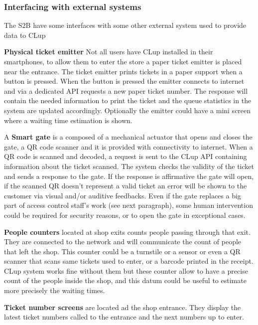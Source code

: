 \subsubsection{Interfacing with external systems}
The S2B have some interfaces with some other external system used to provide data to CLup 



\textbf{Physical ticket emitter} Not all users have CLup installed in their smartphones, to allow them to enter the store a paper ticket emitter is
placed near the entrance. The ticket emitter prints tickets in 
a paper support when a button is pressed. When the button is pressed the emitter connects to internet and via a dedicated API requests a new paper ticket number. The response will contain the needed information to print the ticket and the queue statistics in the system are updated accordingly. Optionally the emitter could have a mini screen where a waiting time estimation is shown.



A \textbf{Smart gate} is a composed of a mechanical actuator that opens and closes the gate, a QR code scanner and it is provided with connectivity to internet. When a QR code is scanned and decoded, a request is sent to the CLup API containing information about the ticket scanned.
The system checks the validity of the ticket and sends a response to the gate. If the response is affirmative the gate will open, if the scanned QR doesn't represent a valid ticket an error will be shown to the customer via visual and/or auditive feedbacks. Even if the gate replaces a big part of access control staff's work (see next paragraph), some human intervention could be required for security reasons, or to open the gate in exceptional cases. 


\textbf{People counters} located at shop exits counts people passing through that exit. They are connected to the network and will communicate the count of people that left the shop. This counter could be a turnstile or a sensor or even a QR scanner that scans same tickets used to enter, or a barcode printed in the receipt. CLup system works fine without them but these counter allow to have a precise count of the people inside the shop, and this datum could be useful to estimate more precisely the waiting times.

\textbf{Ticket number screens} are located ad the shop entrance. They display the latest ticket numbers called to the entrance and the next numbers up to enter.

